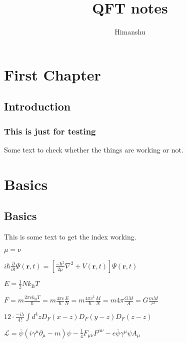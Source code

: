 \documentclass[11pt,a4paper]{book}
\author{Himanshu}
\title{QFT notes}
\begin{document}
\maketitle
\tableofcontents




	
    
\newcommand{\real}[1]{\mathbb{R}^{#1}}
\newcommand{\reall}{\mathbb{R}}
\newcommand{\vect}[1]{\mathbf{#1}}





\chapter{First Chapter}
\section{Introduction}



	
\subsection{This is just for testing}
	
Some text to check whether the things are working or not.
	
\chapter{Basics}
\section{Basics}
This is some text to get the index working.

$\mu = \nu$
	
$	i\hbar {\frac {\partial }{\partial t}}\Psi (\mathbf {r} ,t)=\left[{\frac {-\hbar ^{2}}{2\mu }}\nabla ^{2}+V(\mathbf {r} ,t)\right]\Psi (\mathbf {r} ,t)$

$E = \frac { 1 } { 2 } N k _ { \mathrm { B } } T$

$F = m \frac { 2 \pi c k _ { \mathrm { B } } T } { \hbar } = m \frac { 4 \pi c } { \hbar } \frac { E } { N } = m \frac { 4 \pi c ^ { 3 } } { \hbar } \frac { M } { N } = m 4 \pi \frac { G M } { A } = G \frac { m M } { r ^ { 2 } }$

$12 \cdot \frac { - i \lambda } { 4 ! } \int d ^ { 4 } z D _ { F } ( x - z ) D _ { F } ( y - z ) D _ { F } ( z - z )$


$\mathcal { L } = \overline { \psi } \left( i \gamma ^ { \mu } \partial _ { \mu } - m \right) \psi - \frac { 1 } { 4 } F _ { \mu \nu } F ^ { \mu \nu } - e \overline { \psi } \gamma ^ { \mu } \psi A _ { \mu }$
\end{document}
